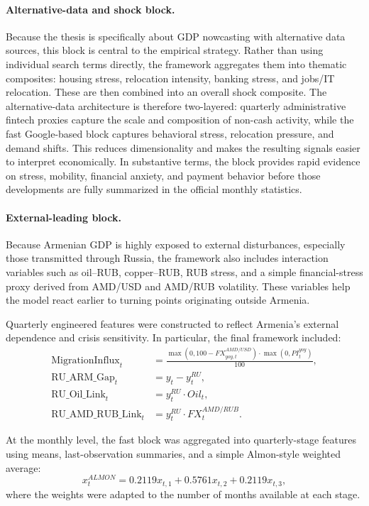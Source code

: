 \documentclass[12pt,a4paper]{report}
\begin{document}
\paragraph{Alternative-data and shock block.}
Because the thesis is specifically about GDP nowcasting with alternative data sources, this block is central to the empirical strategy. Rather than using individual search terms directly, the framework aggregates them into thematic composites: housing stress, relocation intensity, banking stress, and jobs/IT relocation. These are then combined into an overall shock composite. The alternative-data architecture is therefore two-layered: quarterly administrative fintech proxies capture the scale and composition of non-cash activity, while the fast Google-based block captures behavioral stress, relocation pressure, and demand shifts. This reduces dimensionality and makes the resulting signals easier to interpret economically. In substantive terms, the block provides rapid evidence on stress, mobility, financial anxiety, and payment behavior before those developments are fully summarized in the official monthly statistics.

\paragraph{External-leading block.}
Because Armenian GDP is highly exposed to external disturbances, especially those transmitted through Russia, the framework also includes interaction variables such as oil--RUB, copper--RUB, RUB stress, and a simple financial-stress proxy derived from AMD/USD and AMD/RUB volatility. These variables help the model react earlier to turning points originating outside Armenia.

Quarterly engineered features were constructed to reflect Armenia's external dependence and crisis sensitivity. In particular, the final framework included:
\begin{align}
    \text{MigrationInflux}_t &= \frac{\max(0, 100 - FX^{AMD/USD}_{yoy,t}) \cdot \max(0, PI^{yoy}_t)}{100}, \\
    \text{RU\_ARM\_Gap}_t &= y_t - y^{RU}_t, \\
    \text{RU\_Oil\_Link}_t &= y^{RU}_t \cdot Oil_t, \\
    \text{RU\_AMD\_RUB\_Link}_t &= y^{RU}_t \cdot FX^{AMD/RUB}_t.
\end{align}

At the monthly level, the fast block was aggregated into quarterly-stage features using means, last-observation summaries, and a simple Almon-style weighted average:
\begin{equation}
    x^{ALMON}_{t} = 0.2119 x_{t,1} + 0.5761 x_{t,2} + 0.2119 x_{t,3},
\end{equation}
where the weights were adapted to the number of months available at each stage.
\end{document}
